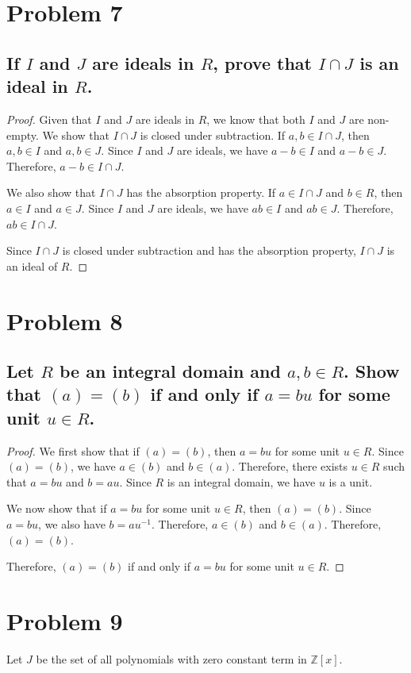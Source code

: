 \documentclass{article}
\theoremstyle{plain} %
\theoremstyle{definition} %
\begin{document}
\section*{Problem 7}
\subsection*{If $I$ and $J$ are ideals in $R$, prove
that $I \cap J$ is an ideal in $R$.}

\begin{proof}
    Given that $I$ and $J$ are ideals in $R$, we know that both $I$ and $J$ are
    non-empty. 
    We show that $I \cap J$ is closed under subtraction. If $a, b \in I \cap J$, then $a, b \in I$ and $a, b \in J$.
    Since $I$ and $J$ are ideals, we have $a-b \in I$ and $a-b \in J$. Therefore, $a-b \in I \cap J$.

    We also show that $I \cap J$ has the absorption property. If $a \in I \cap J$ and $b \in R$, then $a \in I$ and $a \in J$.
    Since $I$ and $J$ are ideals, we have $ab \in I$ and $ab \in J$. Therefore, $ab \in I \cap J$.

    Since $I \cap J$ is closed under subtraction and has the absorption property, $I \cap J$ is an ideal of $R$.
\end{proof}

\section*{Problem 8}
\subsection*{Let $R$ be an integral domain and $a,b \in R$.
Show that $(a) = (b)$ if and only if $a=bu$ for some unit $u \in R$.}
\begin{proof}
    We first show that if $(a) = (b)$, then $a = bu$ for some unit $u \in R$.
    Since $(a) = (b)$, we have $a \in (b)$ and $b \in (a)$.
    Therefore, there exists $u \in R$ such that $a = bu$ and $b = au$.
    Since $R$ is an integral domain, we have $u$ is a unit.

    We now show that if $a = bu$ for some unit $u \in R$, then $(a) = (b)$.
    Since $a = bu$, we also have $b = au^{-1}$. Therefore, $a \in (b)$ and $b \in (a)$.
    Therefore, $(a) = (b)$.

    Therefore, $(a) = (b)$ if and only if $a = bu$ for some unit $u \in R$.
\end{proof}


\section*{Problem 9}
Let $J$ be the set of all polynomials with zero constant term
in $\mathbb{Z}[x]$.
\end{document}

